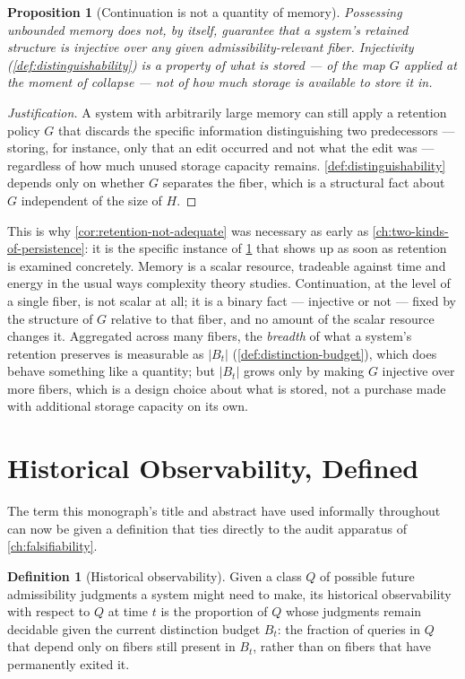 \documentclass[11pt]{book}
\theoremstyle{plain}
\newtheorem{proposition}[theorem]{Proposition}
\theoremstyle{definition}
\newtheorem{definition}[theorem]{Definition}
\theoremstyle{remark}
\begin{document}
\begin{proposition}[Continuation is not a quantity of memory]
\label{prop:not-memory}
Possessing unbounded memory does not, by itself, guarantee that a
system's retained structure is injective over any given
admissibility-relevant fiber. Injectivity (\cref{def:distinguishability})
is a property of \emph{what} is stored --- of the map $G$ applied at
the moment of collapse --- not of \emph{how much} storage is
available to store it in.
\end{proposition}

\begin{proof}[Justification]
A system with arbitrarily large memory can still apply a retention
policy $G$ that discards the specific information distinguishing two
predecessors --- storing, for instance, only that an edit occurred
and not what the edit was --- regardless of how much unused storage
capacity remains. \cref{def:distinguishability} depends only on
whether $G$ separates the fiber, which is a structural fact about $G$
independent of the size of $H$.
\end{proof}

This is why \cref{cor:retention-not-adequate} was necessary as early
as \cref{ch:two-kinds-of-persistence}: it is the specific instance of
\cref{prop:not-memory} that shows up as soon as retention is examined
concretely. Memory is a scalar resource, tradeable against time and
energy in the usual ways complexity theory studies. Continuation, at
the level of a single fiber, is not scalar at all; it is a binary fact
--- injective or not --- fixed by the structure of $G$ relative to that
fiber, and no amount of the scalar resource changes it. Aggregated
across many fibers, the \emph{breadth} of what a system's retention
preserves is measurable as $|B_t|$ (\cref{def:distinction-budget}),
which does behave something like a quantity; but $|B_t|$ grows only by
making $G$ injective over more fibers, which is a design choice about
what is stored, not a purchase made with additional storage capacity
on its own.

\section{Historical Observability, Defined}

The term this monograph's title and abstract have used informally
throughout can now be given a definition that ties directly to the
audit apparatus of \cref{ch:falsifiability}.

\begin{definition}[Historical observability]
\label{def:historical-observability}
Given a class $Q$ of possible future admissibility judgments a system
might need to make, its historical observability with respect to $Q$
at time $t$ is the proportion of $Q$ whose judgments remain decidable
given the current distinction budget $B_t$: the fraction of queries in
$Q$ that depend only on fibers still present in $B_t$, rather than on
fibers that have permanently exited it.
\end{definition}
\end{document}
